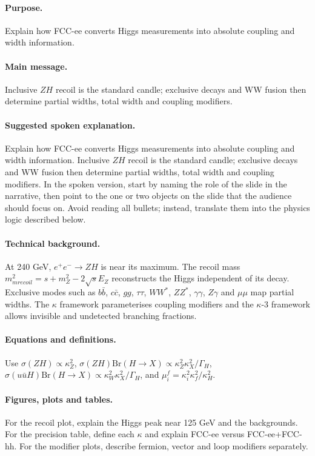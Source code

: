 \documentclass[11pt,a4paper]{report}
\newcommand{\ee}{e^+e^-}
\newcommand{\br}{\mathrm{Br}}
\begin{document}
\paragraph{Purpose.}
Explain how FCC-ee converts Higgs measurements into absolute coupling and width information.

\paragraph{Main message.}
Inclusive $ZH$ recoil is the standard candle; exclusive decays and WW fusion then determine partial widths, total width and coupling modifiers.

\paragraph{Suggested spoken explanation.}
Explain how FCC-ee converts Higgs measurements into absolute coupling and width information. Inclusive $ZH$ recoil is the standard candle; exclusive decays and WW fusion then determine partial widths, total width and coupling modifiers. In the spoken version, start by naming the role of the slide in the narrative, then point to the one or two objects on the slide that the audience should focus on.  Avoid reading all bullets; instead, translate them into the physics logic described below.

\paragraph{Technical background.}
At 240 GeV, $\ee\to ZH$ is near its maximum.  The recoil mass $m_{
m recoil}^2=s+m_Z^2-2\sqrt{s}E_Z$ reconstructs the Higgs independent of its decay.  Exclusive modes such as $b\bar b$, $c\bar c$, $gg$, $\tau\tau$, $WW^*$, $ZZ^*$, $\gamma\gamma$, $Z\gamma$ and $\mu\mu$ map partial widths.  The $\kappa$ framework parameterises coupling modifiers and the $\kappa$-3 framework allows invisible and undetected branching fractions.

\paragraph{Equations and definitions.}
Use $\sigma(ZH)\propto \kappa_Z^2$, $\sigma(ZH)\br(H\to X)\propto \kappa_Z^2\kappa_X^2/\Gamma_H$, $\sigma(
u\bar
u H)\br(H\to X)\propto \kappa_W^2\kappa_X^2/\Gamma_H$, and $\mu_i^f=\kappa_i^2\kappa_f^2/\kappa_H^2$.

\paragraph{Figures, plots and tables.}
For the recoil plot, explain the Higgs peak near 125 GeV and the backgrounds.  For the precision table, define each $\kappa$ and explain FCC-ee versus FCC-ee+FCC-hh.  For the modifier plots, describe fermion, vector and loop modifiers separately.
\end{document}
